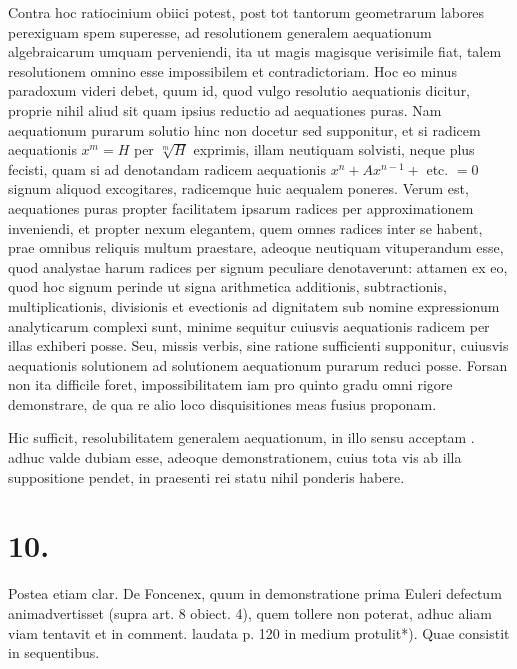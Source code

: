 \documentclass[10pt]{article}
\begin{document}
Contra hoc ratiocinium obiici potest, post tot tantorum geometrarum labores perexiguam spem superesse, ad resolutionem generalem aequationum algebraicarum umquam perveniendi, ita ut magis magisque verisimile fiat, talem resolutionem omnino esse impossibilem et contradictoriam. Hoc eo minus paradoxum videri debet, quum id, quod vulgo resolutio aequationis dicitur, proprie nihil aliud sit quam ipsius reductio ad aequationes puras. Nam aequationum purarum solutio hinc non docetur sed supponitur, et si radicem aequationis \(x^{m}=H\) per \(\sqrt[m]{H}\) exprimis, illam neutiquam solvisti, neque plus fecisti, quam si ad denotandam radicem aequationis \(x^{n}+A x^{n-1}+\) etc. \(=0\) signum aliquod excogitares, radicemque huic aequalem poneres. Verum est, aequationes puras propter facilitatem ipsarum radices per approximationem inveniendi, et propter nexum elegantem, quem omnes radices inter se habent, prae omnibus reliquis multum praestare, adeoque neutiquam vituperandum esse, quod analystae harum radices per signum peculiare denotaverunt: attamen ex eo, quod hoc signum perinde ut signa arithmetica additionis, subtractionis, multiplicationis, divisionis et evectionis ad dignitatem sub nomine expressionum analyticarum complexi sunt, minime sequitur cuiusvis aequationis radicem per illas exhiberi posse. Seu, missis verbis, sine ratione sufficienti supponitur, cuiusvis aequationis solutionem ad solutionem aequationum purarum reduci posse. Forsan non ita difficile foret, impossibilitatem iam pro quinto gradu omni rigore demonstrare, de qua re alio loco disquisitiones meas fusius proponam.

Hic sufficit, resolubilitatem generalem aequationum, in illo sensu acceptam . adhuc valde dubiam esse, adeoque demonstrationem, cuius tota vis ab illa suppositione pendet, in praesenti rei statu nihil ponderis habere.

\section*{10.}
Postea etiam clar. De Foncenex, quum in demonstratione prima Euleri defectum animadvertisset (supra art. 8 obiect. 4), quem tollere non poterat, adhuc aliam viam tentavit et in comment. laudata p. 120 in medium protulit*). Quae consistit in sequentibus.
\end{document}
